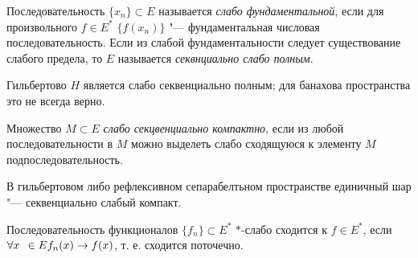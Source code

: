 \documentclass[main]{subfiles}
\begin{document}
\begin{definition}
  Последовательность $\{ x_n \} \subset E$ называется \emph{слабо фундаментальной},
  если для произвольного $f \in E^*$ $\{ f(x_n) \}$ "--- фундаментальная
  числовая последовательность. Если из слабой фундаментальности
  следует существование слабого предела, то $E$ называется
  \emph{секвнциально слабо полным}.
\end{definition}

\begin{exercise}
  Гильбертово $H$ является слабо секвенциально полным; для банахова пространства
  это не всегда верно.
\end{exercise}

\begin{definition}
  Множество $M \subset E$ \emph{слабо секцвенциально компактно},
  если из любой последовательности в $M$
  можно выделеть
  слабо сходящуюся к элементу $M$
  подпоследовательность.
\end{definition}

\begin{theorem*}
  В гильбертовом либо рефлексивном сепарабелтьном пространстве
  единичный шар "--- секвенциально слабый компакт.
\end{theorem*}

\begin{definition}
  Последовательность функционалов \( \{ f_n \} \subset E^* \)
  \( * \)-слабо сходится к \( f \in E^* \), если
  \( \forall {x} \; \, \in E f_n(x) \to f(x) \),
  т. е. сходится поточечно.
\end{definition}
\end{document}
